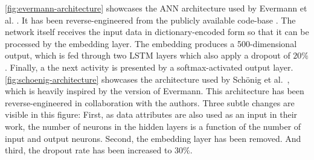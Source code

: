 \autoref{fig:evermann-architecture} showcases the ANN architecture used by Evermann et al. \cite{evermann2016}. It has been reverse-engineered from the publicly available code-base \cite{web:evermann}. The network itself receives the input data in dictionary-encoded form so that it can be processed by the embedding layer. The embedding produces a 500-dimensional output, which is fed through two LSTM layers which also apply a dropout of $20\%$. Finally, a the next activity is presented by a softmax-activated output layer.\\

\autoref{fig:schoenig-architecture} showcases the architecture used by Schönig et al.~\cite{schoenig2018}, which is heavily inspired by the version of Evermann. This architecture has been reverse-engineered in collaboration with the authors. Three subtle changes are visible in this figure: First, as data attributes are also used as an input in their work, the number of neurons in the hidden layers is a function of the number of input and output neurons. Second, the embedding layer has been removed. And third, the dropout rate has been increased to $30\%$.

